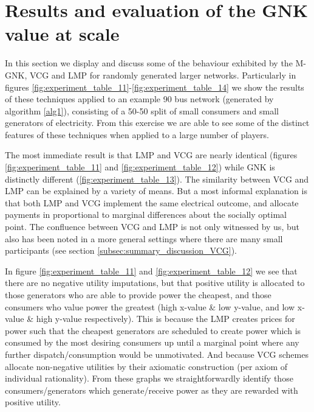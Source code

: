 



\section{Results and evaluation of the GNK value at scale}\label{sec:results_and_evaluation_of_GNK}



In this section we display and discuss some of the behaviour exhibited by the M-GNK, VCG and LMP for randomly generated larger networks.
Particularly in figures \ref{fig:experiment_table_11}-\ref{fig:experiment_table_14} we show the results of these techniques applied to an example 90 bus network (generated by algorithm \ref{alg1}), consisting of a 50-50 split of small consumers and small generators of electricity.
From this exercise we are able to see some of the distinct features of these techniques when applied to a large number of players.

The most immediate result is that LMP and VCG are nearly identical (figures \ref{fig:experiment_table_11} and \ref{fig:experiment_table_12}) while GNK is distinctly different (\ref{fig:experiment_table_13}).
The similarity between VCG and LMP can be explained by a variety of means.
But a most informal explanation is that both LMP and VCG implement the same electrical outcome, and allocate payments in proportional to marginal differences about the socially optimal point.
The confluence between VCG and LMP is not only witnessed by us, but also has been noted in a more general settings where there are many small participants \citep{NATH2019673, 8430852} (see section \ref{subsec:summary_discussion_VCG}).%

In figure \ref{fig:experiment_table_11} and \ref{fig:experiment_table_12} we see that there are no negative utility imputations, but that positive utility is allocated to those generators who are able to provide power the cheapest, and those consumers who value power the greatest (high x-value \& low y-value, and low x-value \& high y-value respectively).
This is because the LMP creates prices for power such that the cheapest generators are scheduled to create power which is consumed by the most desiring consumers up until a marginal point where any further dispatch/consumption would be unmotivated.
And because VCG schemes allocate non-negative utilities by their axiomatic construction (per axiom of individual rationality).
From these graphs we straightforwardly identify those consumers/generators which generate/receive power as they are rewarded with positive utility.

